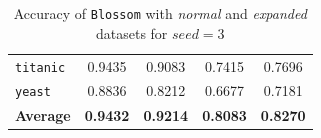 \documentclass[12pt]{report}
\theoremstyle{definition}
\theoremstyle{definition}
\theoremstyle{definition}
\begin{document}
\begin{table}[ht]
\begin{tabular}{lcccc}
    \multicolumn{1}{l}{\tt titanic}       & \multicolumn{1}{c}{0.9435} & \multicolumn{1}{c}{0.9083} & \multicolumn{1}{c}{0.7415} & \multicolumn{1}{c}{0.7696} \\
    \multicolumn{1}{l}{\tt yeast}         & \multicolumn{1}{c}{0.8836} & \multicolumn{1}{c}{0.8212} & \multicolumn{1}{c}{0.6677} & \multicolumn{1}{c}{0.7181} \\
    \hline
    \multicolumn{1}{l}{\bf Average}       & \multicolumn{1}{c}{\bf 0.9432} & \multicolumn{1}{c}{\bf 0.9214} & \multicolumn{1}{c}{\bf 0.8083} & \multicolumn{1}{c}{\bf 0.8270} \\
    \hline
    \end{tabular}
    \caption{Accuracy of \texttt{Blossom} with \textit{normal} and \textit{expanded} datasets for $seed=3$}
    \label{fig:seed3}
\end{table}
\end{document}
